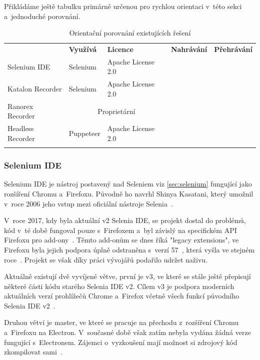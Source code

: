 \documentclass[12pt, a4paper, twoside]{article}
\newcommand{\cmark}{\ding{51}}
\newcommand{\xmark}{\ding{55}}
\begin{document}
	Přikládáme ještě tabulku primárně určenou pro rychlou orientaci v~této sekci a~jednoduché porovnání.
{
	\begin{longtable}{ l|l|l|c|c } 
		\rowcolor{tableHeadingBackground} \multicolumn{1}{l}{\textbf{Název}} & \multicolumn{1}{l}{\textbf{Využívá}} & \multicolumn{1}{l}{\textbf{Licence}} & \multicolumn{1}{l}{\textbf{Nahrávání}} & \multicolumn{1}{l}{\textbf{Přehrávání}} \\
		Selenium IDE & Selenium & Apache License 2.0 & \cmark & \cmark \\
		Katalon Recorder & Selenium & Apache License 2.0 & \cmark & \cmark \\
		Ranorex Recorder & \multicolumn{2}{c}{Proprietární} & \cmark & \cmark \\
		Headless Recorder & Puppeteer & Apache License 2.0 & \cmark & \xmark \\
		\caption{Orientační porovnání existujících řešení}
	\end{longtable}
}
	\subsubsection{Selenium IDE}
	Selenium IDE je nástroj postavený nad Seleniem viz \ref{sec:selenium} fungující jako rozšíření Chromu a~Firefoxu. Původně ho navrhl Shinya Kasatani, který umožnil v~roce 2006 jeho vstup mezi oficiální nástroje Selenia~\cite{seleniumHistory, seleniumIdeGithub}.
	
	V~roce 2017, kdy byla aktuální v2 Selenia IDE, se projekt dostal do problémů, kód v~té době fungoval pouze s~Firefoxem a~byl závislý na specifickém API Firefoxu pro add-ony~\cite{seleniumWhyUse}. Těmto add-onům se dnes říká "legacy extensions", ve Firefoxu byla jejich podpora úplně odstraněna s~verzí 57~\cite{firefoxLegacyExtensions}, která vyšla ve stejném roce~\cite{firefoxReleaseCalendar}. Projekt se však díky práci vývojářů podařilo udržet naživu.
	
	Aktuálně existují dvě vyvíjené větve, první je v3, ve které se stále ještě přepisují některé části kódu starého Selenia IDE v2. Cílem v3 je podpora moderních aktuálních verzí prohlížečů Chrome a~Firefox včetně všech funkcí původního Selenia IDE v2~\cite{seleniumIdeGithub}.
	
	Druhou větví je master, ve které se pracuje na přechodu z~rozšíření Chromu a~Firefoxu na Electron. V~současné době však zatím nebyla vydána žádná verze fungující s~Electronem. Zájemci o~vyzkoušení mají možnost si zdrojový kód zkompilovat sami~\cite{seleniumIdeGithub}.
	
\end{document}
